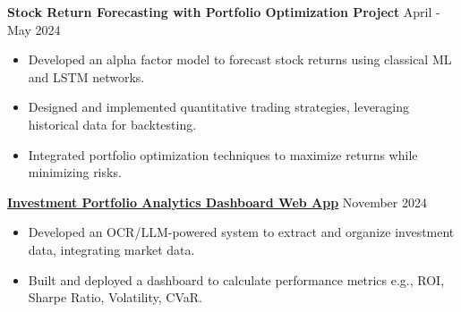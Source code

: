 \documentclass[a4paper, 11pt]{article}
\begin{document}
\textbf{Stock Return Forecasting with Portfolio Optimization Project} \hfill April - May 2024
\begin{itemize}[noitemsep, topsep=0pt, partopsep=0pt, parsep=0pt]
    \item Developed an alpha factor model to forecast stock returns using classical ML and LSTM networks.
    \item Designed and implemented quantitative trading strategies, leveraging historical data for backtesting.
    \item Integrated portfolio optimization techniques to maximize returns while minimizing risks.
\end{itemize}

\vspace{3pt}


\vspace{3pt}

\href{https://investment-portfoliogit-kan92h8iyt5covyupaxqo7.streamlit.app/}{\textbf{Investment Portfolio Analytics Dashboard Web App}} \hfill November 2024
\begin{itemize}[noitemsep, topsep=0pt, partopsep=0pt, parsep=0pt]
    \item Developed an OCR/LLM-powered system to extract and organize investment data, integrating market data.
    \item Built and deployed a dashboard to calculate performance metrics e.g., ROI, Sharpe Ratio, Volatility, CVaR.
\end{itemize}
\vspace{3pt}
\end{document}
